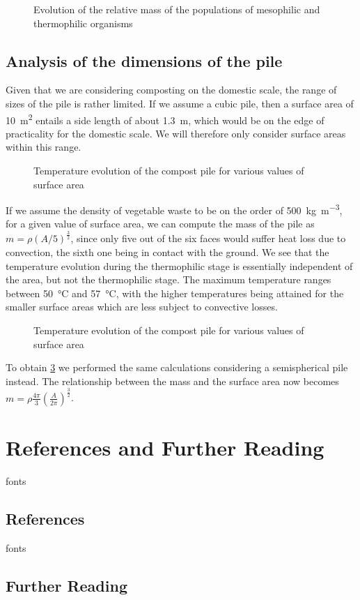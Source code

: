 \documentclass[12pt, a4paper, twocolumn, twoside]{article}
\numberwithin{table}{section}
\numberwithin{figure}{section}
\numberwithin{equation}{section}
\begin{document}
\begin{figure}[htb]
	\sffamily \footnotesize \centering
	
	\caption{Evolution of the relative mass of the populations of mesophilic and thermophilic organisms}
	\label{fig:poblacions}
\end{figure}

\subsection{Analysis of the dimensions of the pile}
Given that we are considering composting on the domestic scale, the range of sizes of the pile is rather limited. If we assume a cubic pile, then a surface area of \SI{10}{m^2}	entails a side length of about \SI{1.3}{m}, which would be on the edge of practicality for the domestic scale. We will therefore only consider surface areas within this range. 

\begin{figure}[htb]
	\sffamily \footnotesize \centering
	
	\caption{Temperature evolution of the compost pile for various values of surface area}
	\label{fig:temp-arees}
\end{figure}

If we assume the density of vegetable waste to be on the order of \SI{500}{kg.m^{-3}}, for a given value of surface area, we can compute the mass of the pile as \( m = \rho(A/5)^{\frac{3}{2}} \), since only five out of the six faces would suffer heat loss due to convection, the sixth one being in contact with the ground. We see that the temperature evolution during the thermophilic stage is essentially independent of the area, but not the thermophilic stage. The maximum temperature ranges between \SI{50}{\celsius} and \SI{57}{\celsius}, with the higher temperatures being attained for the smaller surface areas which are less subject to convective losses.   

\begin{figure}[htb]
	\sffamily \footnotesize \centering
	
	\caption{Temperature evolution of the compost pile for various values of surface area}
	\label{fig:temp-semiesferes}
\end{figure}

To obtain \cref{fig:temp-semiesferes} we performed the same calculations considering a semispherical pile instead. The relationship between the mass and the surface area now becomes \( m = \rho\frac{4\pi}{3}(\frac{A}{2\pi})^{\frac{3}{2}} \).

\clearpage
\appendix

\section{References and Further Reading}
\begin{btSect}{fonts}
	
	\subsection*{References}	
	\btPrintCited
\end{btSect}

\begin{btSect}{fonts}
	
	\subsection*{Further Reading}	
	\btPrintNotCited
\end{btSect}
\end{document}
